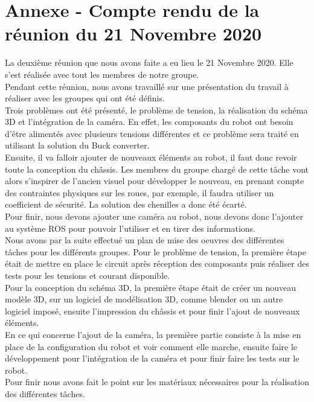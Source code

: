 \documentclass{PackagerQualityN}
\begin{document}
\newp
\section*{Annexe - Compte rendu de la réunion du 21 Novembre 2020}
La deuxième réunion que nous avons faite a eu lieu le 21 Novembre 2020. Elle s'est réalisée avec tout les membres de notre groupe.\\

Pendant cette réunion, nous avons travaillé sur une présentation du travail à réaliser avec les groupes qui ont été définis.\\

Trois problèmes ont été présenté, le problème de tension, la réalisation du schéma 3D et l'intégration de la caméra.
En effet, les composants du robot ont besoin d’être alimentés avec plusieurs tensions différentes et ce problème sera traité en utilisant la solution du Buck converter.
\\
Ensuite, il va falloir ajouter de nouveaux éléments au robot, il faut donc revoir toute la conception du châssis.
Les membres du groupe chargé de cette tâche vont alors s’inspirer de l’ancien visuel pour développer le nouveau, en prenant compte des contraintes physiques sur les roues, par exemple, il faudra utiliser un coefficient de sécurité.
La solution des chenilles a donc été écarté.
\\
Pour finir, nous devons ajouter une caméra au robot, nous devons donc l’ajouter au système ROS pour pouvoir l’utiliser et en tirer des informations.
\\

Nous avons par la suite effectué un plan de mise des oeuvres des différentes tâches pour les différents groupes.
Pour le problème de tension, la première étape était de mettre en place le circuit après réception des composants puis réaliser des tests pour les tensions et courant disponible.
\\
Pour la conception du schéma 3D, la première étape était de créer un nouveau modèle 3D, sur un logiciel de modélisation 3D, comme blender ou un autre logiciel imposé, ensuite l'impression du châssis et pour finir l'ajout de nouveaux éléments.
\\
En ce qui concerne l'ajout de la caméra, la première partie consiste à la mise en place de la configuration du robot et voir comment elle marche, ensuite faire le développement pour l'intégration de la caméra et pour finir faire les tests sur le robot.
\\
Pour finir nous avons fait le point sur les matériaux nécessaires pour la réalisation des différentes tâches.
\end{document}
